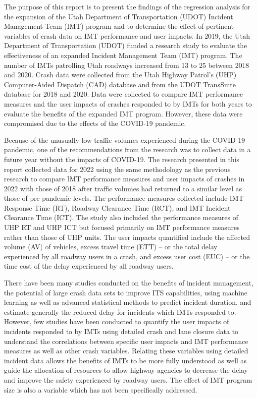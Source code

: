 \documentclass[
  letterpaper,
  authoryear]{elsarticle}
\begin{document}
The purpose of this report is to present the findings of the regression
analysis for the expansion of the Utah Department of Transportation
(UDOT) Incident Management Team (IMT) program and to determine the
effect of pertinent variables of crash data on IMT performance and user
impacts. In 2019, the Utah Department of Transportation (UDOT) funded a
research study to evaluate the effectiveness of an expanded Incident
Management Team (IMT) program. The number of IMTs patrolling Utah
roadways increased from 13 to 25 between 2018 and 2020. Crash data were
collected from the Utah Highway Patrol's (UHP) Computer-Aided Dispatch
(CAD) database and from the UDOT TransSuite database for 2018 and 2020.
Data were collected to compare IMT performance measures and the user
impacts of crashes responded to by IMTs for both years to evaluate the
benefits of the expanded IMT program. However, these data were
compromised due to the effects of the COVID-19 pandemic.

Because of the unusually low traffic volumes experienced during the
COVID-19 pandemic, one of the recommendations from the research was to
collect data in a future year without the impacts of COVID-19. The
research presented in this report collected data for 2022 using the same
methodology as the previous research to compare IMT performance measures
and user impacts of crashes in 2022 with those of 2018 after traffic
volumes had returned to a similar level as those of pre-pandemic levels.
The performance measures collected include IMT Response Time (RT),
Roadway Clearance Time (RCT), and IMT Incident Clearance Time (ICT). The
study also included the performance measures of UHP RT and UHP ICT but
focused primarily on IMT performance measures rather than those of UHP
units. The user impacts quantified include the affected volume (AV) of
vehicles, excess travel time (ETT) -- or the total delay experienced by
all roadway users in a crash, and excess user cost (EUC) -- or the time
cost of the delay experienced by all roadway users.

There have been many studies conducted on the benefits of incident
management, the potential of large crash data sets to improve ITS
capabilities, using machine learning as well as advanced statistical
methods to predict incident duration, and estimate generally the reduced
delay for incidents which IMTs responded to. However, few studies have
been conducted to quantify the user impacts of incidents responded to by
IMTs using detailed crash and lane closure data to understand the
correlations between specific user impacts and IMT performance measures
as well as other crash variables. Relating these variables using
detailed incident data allows the benefits of IMTs to be more fully
understood as well as guide the allocation of resources to allow highway
agencies to decrease the delay and improve the safety experienced by
roadway users. The effect of IMT program size is also a variable which
has not been specifically addressed.
\end{document}
